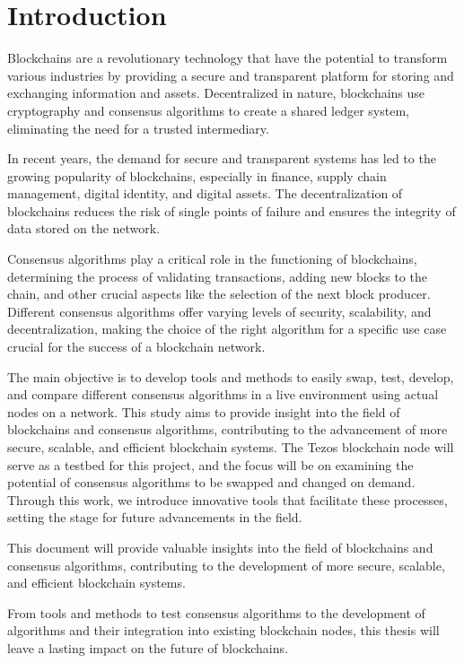 \chapter{Introduction}
\label{chap:int}



Blockchains are a revolutionary technology that have the potential to transform various industries by providing a secure and transparent platform for storing and exchanging information and assets. Decentralized in nature, blockchains use cryptography and consensus algorithms to create a shared ledger system, eliminating the need for a trusted intermediary.

In recent years, the demand for secure and transparent systems has led to the growing popularity of blockchains, especially in finance, supply chain management, digital identity, and digital assets. The decentralization of blockchains reduces the risk of single points of failure and ensures the integrity of data stored on the network.

Consensus algorithms play a critical role in the functioning of blockchains, determining the process of validating transactions, adding new blocks to the chain, and other crucial aspects like the selection of the next block producer. Different consensus algorithms offer varying levels of security, scalability, and decentralization, making the choice of the right algorithm for a specific use case crucial for the success of a blockchain network.

The main objective is to develop tools and methods to easily swap, test, develop, and compare different consensus algorithms in a live environment using actual nodes on a network. This study aims to provide insight into the field of blockchains and consensus algorithms, contributing to the advancement of more secure, scalable, and efficient blockchain systems. The Tezos \cite{goodman2014tezos} blockchain node will serve as a testbed for this project, and the focus will be on examining the potential of consensus algorithms to be swapped and changed on demand. Through this work, we introduce innovative tools that facilitate these processes, setting the stage for future advancements in the field.

This document will provide valuable insights into the field of blockchains and consensus algorithms, contributing to the development of more secure, scalable, and efficient blockchain systems.

From tools and methods to test consensus algorithms to the development of algorithms and their integration into existing blockchain nodes, this thesis will leave a lasting impact on the future of blockchains.

